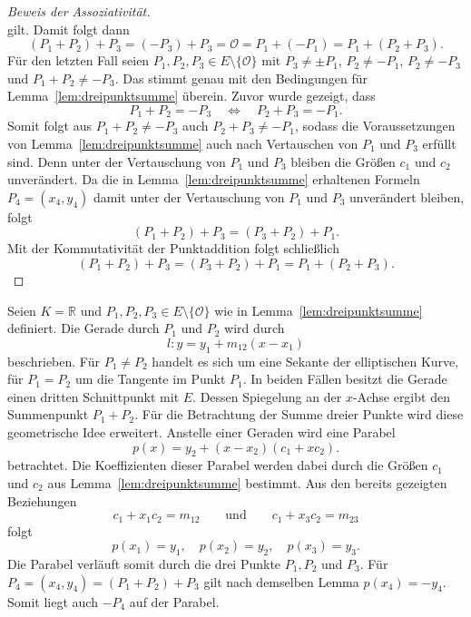 \begin{proof}[Beweis der Assoziativität]
\[    \]
    gilt. Damit folgt dann
    \[
        (P_1+P_2)+P_3=(-P_3)+P_3=\mathcal{O}=P_1+(-P_1)=P_1+(P_2+P_3).
    \]
    Für den letzten Fall seien $P_1,P_2,P_3\in E\setminus\{\mathcal{O}\}$ mit $P_3\neq\pm P_1$, $P_2\neq -P_1$, $P_2\neq-P_3$ und $P_1+P_2\neq-P_3$. Das stimmt genau mit den Bedingungen für Lemma~\ref{lem:dreipunktsumme} überein. Zuvor wurde gezeigt, dass
    \[
        P_1+P_2=-P_3
        \quad\Longleftrightarrow\quad
        P_2+P_3=-P_1.
    \]
    Somit folgt aus $P_1+P_2\neq-P_3$ auch $P_2+P_3\neq-P_1$, sodass die Voraussetzungen von
    Lemma~\ref{lem:dreipunktsumme} auch nach Vertauschen von $P_1$ und $P_3$ erfüllt sind. Denn unter der Vertauschung von $P_1$ und $P_3$ bleiben die Größen $c_1$ und $c_2$ unverändert. Da die in Lemma~\ref{lem:dreipunktsumme} erhaltenen Formeln $P_4=(x_4,y_4)$ damit unter der Vertauschung von $P_1$ und $P_3$ unverändert bleiben, folgt
    \[
        (P_1+P_2)+P_3=(P_3+P_2)+P_1.
    \]
    Mit der Kommutativität der Punktaddition folgt schließlich
    \[
        (P_1+P_2)+P_3
        =(P_3+P_2)+P_1
        =P_1+(P_2+P_3).
    \]
\end{proof}

\begin{bemerkung}
    Seien $K=\mathbb{R}$ und $P_1,P_2,P_3\in E\setminus\{\mathcal{O}\}$ wie in Lemma~\ref{lem:dreipunktsumme} definiert. Die Gerade durch $P_1$ und $P_2$ wird durch
    \[
        l:y=y_1+m_{12}(x-x_1)
    \]
    beschrieben. Für $P_1\neq P_2$ handelt es sich um eine Sekante der
    elliptischen Kurve, für $P_1=P_2$ um die Tangente im Punkt $P_1$.
    In beiden Fällen besitzt die Gerade einen dritten Schnittpunkt mit
    $E$. Dessen Spiegelung an der $x$-Achse ergibt den Summenpunkt
    $P_1+P_2$. Für die Betrachtung der Summe dreier Punkte wird diese geometrische
    Idee erweitert. Anstelle einer Geraden wird eine Parabel
    \[
        p(x)=y_2+(x-x_2)(c_1+xc_2).
    \]
    betrachtet. Die Koeffizienten dieser Parabel werden dabei durch die Größen $c_1$ und $c_2$ aus Lemma~\ref{lem:dreipunktsumme} bestimmt. Aus den bereits gezeigten Beziehungen
    \[
        c_1+x_1c_2=m_{12}\qquad\text{und}\qquad
        c_1+x_3c_2=m_{23}
    \]
    folgt
    \[
        p(x_1)=y_1, \quad p(x_2)=y_2,\quad
        p(x_3)=y_3.
    \]
    Die Parabel verläuft somit durch die drei Punkte $P_1,P_2$ und $P_3$. Für $P_4=(x_4,y_4)=(P_1+P_2)+P_3$ gilt nach demselben Lemma $p(x_4)=-y_4$. Somit liegt auch $-P_4$ auf der Parabel.
\end{bemerkung}


